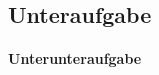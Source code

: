 \documentclass[12pt]{scrartcl}
\begin{document}


	\subsection*{Unteraufgabe}

	\paragraph{Unterunteraufgabe}
\end{document}

